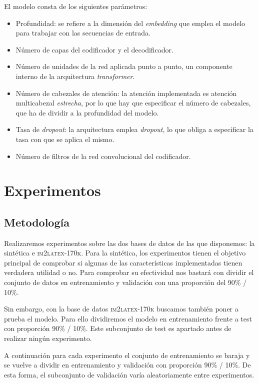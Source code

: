 \documentclass[a4paper, 20pt, dvipsnames]{article}
\begin{document}
El modelo consta de los siguientes parámetros:
\begin{itemize}
\item
  Profundidad: se refiere a la dimensión del \emph{embedding} que emplea el
  modelo para trabajar con las secuencias de entrada.
\item
  Número de capas del codificador y el decodificador.
\item
  Número de unidades de la red aplicada punto a punto, un componente interno de
  la arquitectura \emph{transformer}.
\item
  Número de cabezales de atención: la atención implementada es atención
  multicabezal \emph{estrecha}, por lo que hay que especificar el número de
  cabezales, que ha de dividir a la profundidad del modelo.
\item
  Tasa de \emph{dropout}: la arquitectura emplea \emph{dropout}, lo que obliga a
  especificar la tasa con que se aplica el mismo.
\item
  Número de filtros de la red convolucional del codificador.
\end{itemize}

\section{Experimentos}

\subsection{Metodología}

Realizaremos experimentos sobre las dos bases de datos de las que disponemos: la
sintética e \textsc{im2latex-170k}. Para la sintética, los experimentos tienen
el objetivo principal de comprobar si algunas de las características
implementadas tienen verdadera utilidad o no. Para comprobar su efectividad nos
bastará con dividir el conjunto de datos en entrenamiento y validación con una
proporción del 90\% / 10\%.

Sin embargo, con la base de datos \textsc{im2latex-170k} buscamos también poner
a prueba el modelo. Para ello dividiremos el modelo en entrenamiento frente a
test con proporción 90\% / 10\%. Este subconjunto de test es apartado antes de
realizar ningún experimento.

A continuación para cada experimento el conjunto de entrenamiento se baraja y se
vuelve a dividir en entrenamiento y validación con proporción 90\% / 10\%. De
esta forma, el subconjunto de validación varía aleatoriamente entre
experimentos.
\end{document}
